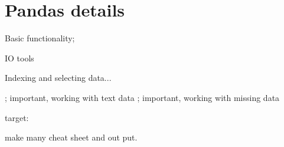 \section{Pandas details}


Basic functionality; 

IO tools

Indexing and selecting data...


; important, working with text data
; important, working with missing data


target:


make many cheat sheet and out put.



